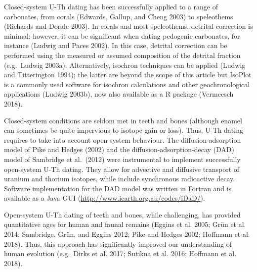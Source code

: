 \documentclass[]{elsarticle} %
\begin{document}
Closed-system U-Th dating has been successfully applied to a range of carbonates, from corals (Edwards, Gallup, and Cheng 2003) to speleothems (Richards and Dorale 2003). In corals and most speleothems, detrital correction is minimal; however, it can be significant when dating pedogenic carbonates, for instance (Ludwig and Paces 2002). In this case, detrital correction can be performed using the measured or assumed composition of the detrital fraction (e.g.~Ludwig 2003a). Alternatively, isochron techniques can be applied (Ludwig and Titterington 1994); the latter are beyond the scope of this article but IsoPlot is a commonly used software for isochron calculations and other geochronological applications (Ludwig 2003b), now also available as a R package (Vermeesch 2018).

Closed-system conditions are seldom met in teeth and bones (although enamel can sometimes be quite impervious to isotope gain or loss). Thus, U-Th dating requires to take into account open system behaviour. The diffusion-adsorption model of Pike and Hedges (2002) and the diffusion-adsorption-decay (DAD) model of Sambridge et al.~(2012) were instrumental to implement successfully open-system U-Th dating. They allow for advective and diffusive transport of uranium and thorium isotopes, while include synchronous radioactive decay. Software implementation for the DAD model was written in Fortran and is available as a Java GUI (\url{http://www.iearth.org.au/codes/iDaD/}).

Open-system U-Th dating of teeth and bones, while challenging, has provided quantitative ages for human and faunal remains (Eggins et al. 2005; Grün et al. 2014; Sambridge, Grün, and Eggins 2012; Pike and Hedges 2002; Hoffmann et al. 2018). Thus, this approach has significantly improved our understanding of human evolution (e.g.~Dirks et al. 2017; Sutikna et al. 2016; Hoffmann et al. 2018).
\end{document}
